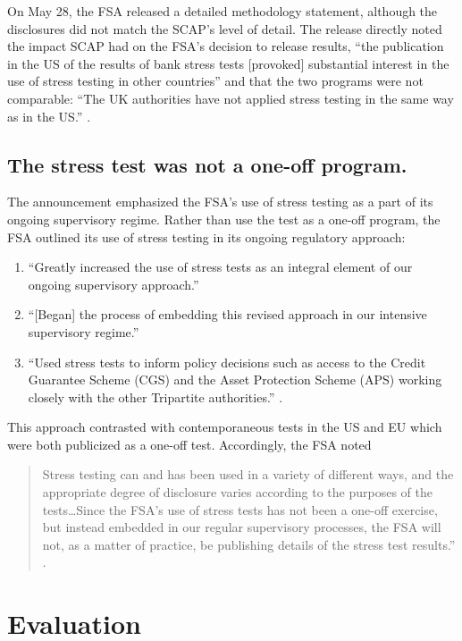 \documentclass[12pt]{article}
\begin{document}
On May 28, the FSA released a detailed methodology statement, although the disclosures did not match the SCAP's level of detail. The release directly noted the impact SCAP had on the FSA's decision to release results, ``the publication in the US of the results of bank stress tests [provoked] substantial interest in the use of stress testing in other countries'' and that the two programs were not comparable: ``The UK authorities have not applied stress testing in the same way as in the US.'' \citep{Results}.

\subsection{The stress test was not a one-off program.}

The announcement emphasized the FSA's use of stress testing as a part of its ongoing supervisory regime. Rather than use the test as a one-off program, the FSA outlined its use of stress testing in its ongoing regulatory approach:

\begin{enumerate}
 \item ``Greatly increased the use of stress tests as an integral element of our ongoing supervisory approach.''
 \item ``[Began] the process of embedding this revised approach in our intensive supervisory regime.''
 \item ``Used stress tests to inform policy decisions such as access to the Credit Guarantee Scheme (CGS) and the Asset Protection Scheme (APS) working closely with the other Tripartite authorities.'' \citep{Results}.
\end{enumerate}

This approach contrasted with contemporaneous tests in the US and EU which were both publicized as a one-off test. Accordingly, the FSA noted

\begin{quote}
  Stress testing can and has been used in a variety of different ways, and the appropriate degree of disclosure varies according to the purposes of the tests\dots Since the FSA's use of stress tests has not been a one-off exercise, but instead embedded in our regular supervisory processes, the FSA will not, as a matter of practice, be publishing details of the stress test results.'' \citep{Results}.
\end{quote}

\section{Evaluation}
\end{document}
